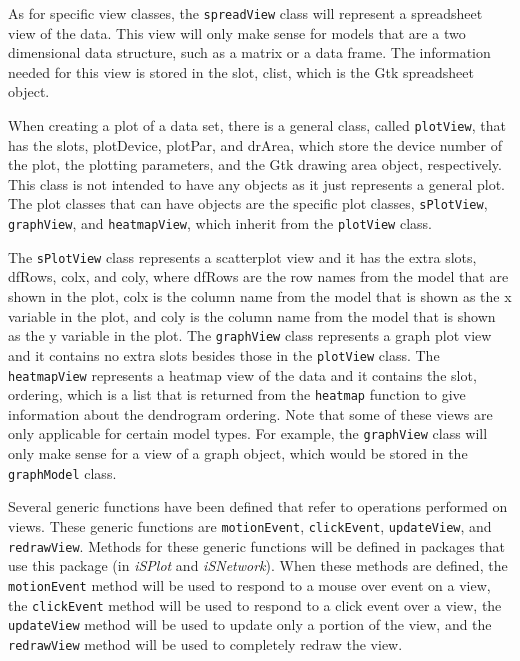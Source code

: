 \documentclass[11pt]{article}
\newcommand{\Rfunction}[1]{{\texttt{#1}}}
\newcommand{\Robject}[1]{{\texttt{#1}}}
\newcommand{\Rpackage}[1]{{\textit{#1}}}
\begin{document}
As for specific view classes, the \Robject{spreadView} class will represent a
spreadsheet view of the data.  This view will only make sense for models that
are a two dimensional data structure, such as a matrix or a data frame.  The
information needed for this view is stored in the slot, clist, which is the
Gtk spreadsheet object.

When creating a plot of a data set, there is a general class, called
\Robject{plotView}, that has the slots, plotDevice, plotPar, and drArea, which
store the device number of the plot, the plotting parameters, and the Gtk
drawing area object, respectively.  This class is not intended to have any
objects as it just represents a general plot.  The plot classes that can have
objects are the specific plot classes, \Robject{sPlotView},
\Robject{graphView}, and \Robject{heatmapView}, which inherit from the
\Robject{plotView} class.  

The \Robject{sPlotView} class represents a scatterplot view and it has the
extra slots, dfRows, colx, and coly, where dfRows are the row names from the
model that are shown in the plot, colx is the column name from the model that
is shown as the x variable in the plot, and coly is the column name from the
model that is shown as the y variable in the plot.  The \Robject{graphView}
class represents a graph plot view and it contains no extra slots besides
those in the \Robject{plotView} class.  The \Robject{heatmapView} represents a
heatmap view of the data and it contains the slot, ordering, which is a list
that is returned from the \Rfunction{heatmap} function to give information
about the dendrogram ordering.  Note that some of these views are only
applicable for certain model types. For example, the \Robject{graphView} class
will only make sense for a view of a graph object, which would be stored in the
\Robject{graphModel} class. 

Several generic functions have been defined that refer to operations 
performed on views.  These generic functions are \Rfunction{motionEvent}, 
\Rfunction{clickEvent}, \Rfunction{updateView}, and \Rfunction{redrawView}.  
Methods for these generic 
functions will be defined in packages that use this package (in 
\Rpackage{iSPlot} and \Rpackage{iSNetwork}).  When these methods are defined, 
the \Rfunction{motionEvent} method will be used to respond to a mouse over 
event on a view, the \Rfunction{clickEvent} method will be used to respond to 
a click event over a view, the \Rfunction{updateView} method will be used to 
update only a portion of the view, and the \Rfunction{redrawView} method will 
be used to completely redraw the view.
\end{document}
